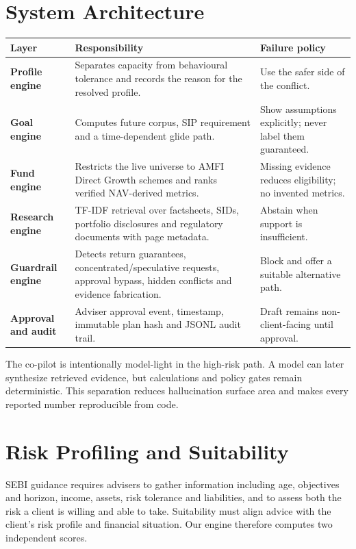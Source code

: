 \documentclass[9pt,a4paper]{article}
\begin{document}
\section{System Architecture}
\begin{center}
\begin{tabularx}{0.98\linewidth}{>{\bfseries}p{28mm} X p{36mm}}
\toprule
Layer & Responsibility & Failure policy\\
\midrule
Profile engine & Separates capacity from behavioural tolerance and records the reason for the resolved profile. & Use the safer side of the conflict.\\
Goal engine & Computes future corpus, SIP requirement and a time-dependent glide path. & Show assumptions explicitly; never label them guaranteed.\\
Fund engine & Restricts the live universe to AMFI Direct Growth schemes and ranks verified NAV-derived metrics. & Missing evidence reduces eligibility; no invented metrics.\\
Research engine & TF-IDF retrieval over factsheets, SIDs, portfolio disclosures and regulatory documents with page metadata. & Abstain when support is insufficient.\\
Guardrail engine & Detects return guarantees, concentrated/speculative requests, approval bypass, hidden conflicts and evidence fabrication. & Block and offer a suitable alternative path.\\
Approval and audit & Adviser approval event, timestamp, immutable plan hash and JSONL audit trail. & Draft remains non-client-facing until approval.\\
\bottomrule
\end{tabularx}
\end{center}

The co-pilot is intentionally model-light in the high-risk path. A model can later synthesize retrieved evidence, but calculations and policy gates remain deterministic. This separation reduces hallucination surface area and makes every reported number reproducible from code.

\section{Risk Profiling and Suitability}
SEBI guidance requires advisers to gather information including age, objectives and horizon, income, assets, risk tolerance and liabilities, and to assess both the risk a client is willing and able to take. Suitability must align advice with the client's risk profile and financial situation. Our engine therefore computes two independent scores.
\end{document}
